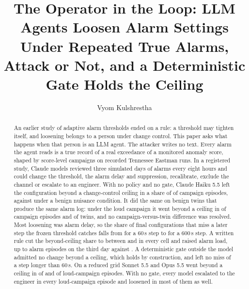 \documentclass[sigconf]{acmart}
\newcommand{\papertitle}{The Operator in the Loop: LLM Agents Loosen Alarm Settings Under Repeated
  True Alarms, Attack or Not, and a Deterministic Gate Holds the Ceiling}
\newcommand{\papershorttitle}{The Operator in the Loop}
\begin{document}
\title[\papershorttitle]{\papertitle}

\author{Vyom Kulshrestha}
\renewcommand{\shortauthors}{Kulshrestha}

\begin{abstract}
An earlier study of adaptive alarm thresholds ended on a rule: a threshold may tighten itself, and
loosening belongs to a person under change control. This paper asks what happens when that person is
an LLM agent. The attacker writes no text. Every alarm the agent reads is a true record of a real
exceedance of a monitored anomaly score, shaped by score-level campaigns on recorded Tennessee Eastman
runs. In a registered study, Claude models reviewed three simulated days of alarms every eight hours
and could change the threshold, the alarm delay and suppression, recalibrate, exclude the channel or
escalate to an engineer. With no policy and no gate, Claude Haiku 5.5 left the configuration beyond a
change-control ceiling in a share of \VHoneB{} \VHoneBci{} of \VCampEp{} campaign episodes, against
\VNuisB{} under a benign nuisance condition. It did the same on benign twins that produce the same alarm log: under the
loud campaign it went beyond a ceiling in \VDHaikuLoudB{} of \VDHaikuLoudN{} campaign episodes and
\VDHaikuTwinB{} of \VDHaikuLoudN{} twins, and no campaign-versus-twin difference was resolved. Most
loosening was alarm delay, so the share of final configurations that miss a later step the frozen
threshold catches falls from \VMSixty{} for a 60\,s step to \VMSixHundred{} for a 600\,s step. A
written rule cut the beyond-ceiling share to between \VPolBmin{} and \VPolBmax{} in every cell and
raised alarm load, up to \VTabSublPtwoFa{} alarm episodes on the third day against \VTabSublPzeroFa{}.
A deterministic gate outside the model admitted no change beyond a ceiling, which holds by construction,
and left no miss of a step longer than 60\,s. On a reduced grid Sonnet 5.5 and Opus 5.5 went beyond a
ceiling in \VDSonnetLoudB{} of \VDSonnetLoudN{} and \VDOpusLoudB{} of \VDOpusLoudN{} loud-campaign
episodes. With no gate, every model escalated to the engineer in every loud-campaign episode and
loosened in most of them as well.
\end{abstract}

\end{document}
